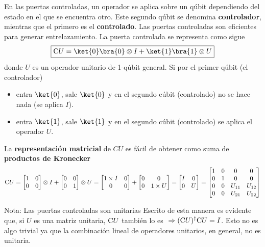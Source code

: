 \documentclass[a4paper,11pt]{book} %
\numberwithin{equation}{chapter}
\newcommand{\cg}[1]{{\rm C}#1}
\begin{document}
En las puertas controladas, un operador se aplica sobre un qúbit dependiendo del estado en el que se encuentra otro. Este segundo qúbit se denomina \textbf{controlador}, mientras que el primero es el \textbf{controlado}. Las puertas controladas son eficientes para generar entrelazamiento.
La puerta controlada  se representa como sigue
	\begin{equation}
	\boxed{\cg{U} = \ket{0}\bra{0}\otimes I + \ket{1}\bra{1}\otimes U}
	\end{equation}
donde $U$ es un operador unitario de 1-qúbit general. Si por el primer qúbit (el controlador)
\begin{itemize}
	\item entra $\ket{0}$, sale $\ket{0}$ y en el segundo cúbit (controlado) no se hace nada (se aplica $I$).
	\item entra $\ket{1}$, sale $\ket{1}$ y en el segundo cúbit (controlado) se aplica el operador $U$.
\end{itemize}
La \textbf{representación matricial} de $CU$ es fácil de obtener como suma de  \textbf{productos de Kronecker}
	\begin{equation}
	\cg{U} = \begin{bmatrix}1 & 0 \\ 0 & 0 \end{bmatrix}\otimes  I +  \begin{bmatrix}0 & 0 \\ 0 & 1 \end{bmatrix} \otimes U
= \begin{bmatrix} 1\times I & 0 \\ 0 & 0 \end{bmatrix}  + 
\begin{bmatrix} 0 & 0 \\ 0 & 1\times U \end{bmatrix} = \begin{bmatrix}   I & 0 \\ 0 &   U \end{bmatrix} = 
\begin{bmatrix} 1 & 0 & 0 & 0 \\ 0 & 1 & 0 & 0 \\ 0 & 0 & U_{11} & U_{12} \\
0 & 0 & U_{21} & U_{22}\end{bmatrix}
	\end{equation}

	\begin{mybox_blue}{Nota: Las puertas controladas son unitarias}
	Escrito de esta manera es evidente que, si $U$ es una matriz unitaria, $\cg{U}$ también lo es 
	$~\Rightarrow (\cg{U})^\dagger \cg{U} = I$. Esto no es algo trivial ya que la combinación lineal de operadores 
	unitarios, en general, no es  unitaria.
	\end{mybox_blue}
\end{document}
